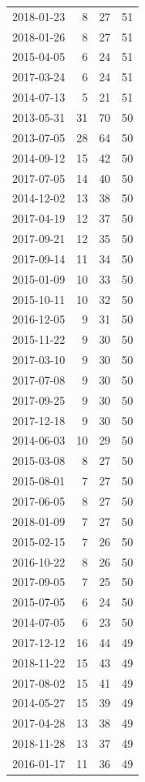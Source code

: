 \begin{tabular}{lrrr}
2018-01-23 & 8 & 27 & 51 \\
2018-01-26 & 8 & 27 & 51 \\
2015-04-05 & 6 & 24 & 51 \\
2017-03-24 & 6 & 24 & 51 \\
2014-07-13 & 5 & 21 & 51 \\
2013-05-31 & 31 & 70 & 50 \\
2013-07-05 & 28 & 64 & 50 \\
2014-09-12 & 15 & 42 & 50 \\
2017-07-05 & 14 & 40 & 50 \\
2014-12-02 & 13 & 38 & 50 \\
2017-04-19 & 12 & 37 & 50 \\
2017-09-21 & 12 & 35 & 50 \\
2017-09-14 & 11 & 34 & 50 \\
2015-01-09 & 10 & 33 & 50 \\
2015-10-11 & 10 & 32 & 50 \\
2016-12-05 & 9 & 31 & 50 \\
2015-11-22 & 9 & 30 & 50 \\
2017-03-10 & 9 & 30 & 50 \\
2017-07-08 & 9 & 30 & 50 \\
2017-09-25 & 9 & 30 & 50 \\
2017-12-18 & 9 & 30 & 50 \\
2014-06-03 & 10 & 29 & 50 \\
2015-03-08 & 8 & 27 & 50 \\
2015-08-01 & 7 & 27 & 50 \\
2017-06-05 & 8 & 27 & 50 \\
2018-01-09 & 7 & 27 & 50 \\
2015-02-15 & 7 & 26 & 50 \\
2016-10-22 & 8 & 26 & 50 \\
2017-09-05 & 7 & 25 & 50 \\
2015-07-05 & 6 & 24 & 50 \\
2014-07-05 & 6 & 23 & 50 \\
2017-12-12 & 16 & 44 & 49 \\
2018-11-22 & 15 & 43 & 49 \\
2017-08-02 & 15 & 41 & 49 \\
2014-05-27 & 15 & 39 & 49 \\
2017-04-28 & 13 & 38 & 49 \\
2018-11-28 & 13 & 37 & 49 \\
2016-01-17 & 11 & 36 & 49 \\

\end{tabular}
